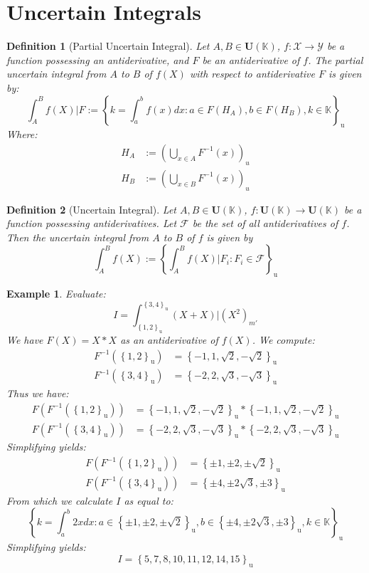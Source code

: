 \documentclass[a4paper,12pt,twoside]{memoir}
\newtheorem{definition}{Definition}[chapter]
\newtheorem{example}{Example}[chapter]
\newcommand{\set}[1]{\left\{#1\right\}} %
\newcommand{\s}[1]{\set{#1}_\mathrm{u}} %
\newcommand{\tsbd}[1]{\mathbf{U}(\mathbb{#1})}
\begin{document}
	\section{Uncertain Integrals}
	
	\begin{definition}[Partial Uncertain Integral]
		Let $A,B \in \tsbd{K}$, $f: \mathcal{X} \to \mathcal{Y}$ be a function possessing an antiderivative, and $F$ be an antiderivative of $f$. The partial uncertain integral from $A$ to $B$ of $f(X)$ with respect to antiderivative $F$ is given by:
		\[
		\int_{A}^{B}{f(X)|F} := \s{k = \int_{a}^{b}f(x)dx : a \in F(H_A), b \in F(H_B), k \in \mathbb{K}}
		\]
		Where:
		\begin{align*}
			H_A & := \left(\bigcup_{x \in A}{F^{-1}(x)}\right)_u  \\
			H_B & := \left(\bigcup_{x \in B}{F^{-1}(x)}\right)_u
		\end{align*}
	\end{definition}
	
	\begin{definition}[Uncertain Integral]
		Let $A,B \in \tsbd{K}$, $f: \tsbd{K} \to \tsbd{K}$ be a function possessing antiderivatives. Let $\mathcal{F}$ be the set of all antiderivatives of $f$. Then the uncertain integral from $A$ to $B$ of $f$ is given by
		\[
		\int_{A}^{B}{f(X)} := \s{\int_{A}^{B}f(X)|F_i : F_i \in \mathcal{F}}
		\]
	\end{definition}
	
	\begin{example}
		Evaluate:
		\[I = \int_{\s{1,2}}^{\s{3,4}}{(X+X)|(X^2)_{m'}}\]
		We have $F(X) = X*X$ as an antiderivative of $f(X)$. We compute:
		\begin{align*}
			F^{-1}(\s{1,2}) & = \s{-1,1,\sqrt{2},-\sqrt{2}} \\
			F^{-1}(\s{3,4}) & = \s{-2,2,\sqrt{3},-\sqrt{3}}
		\end{align*}
		Thus we have:
		\begin{align*}
			F(F^{-1}(\s{1,2})) & = \s{-1,1,\sqrt{2},-\sqrt{2}} * \s{-1,1,\sqrt{2},-\sqrt{2}} \\
			F(F^{-1}(\s{3,4})) & = \s{-2,2,\sqrt{3},-\sqrt{3}} * \s{-2,2,\sqrt{3},-\sqrt{3}}
		\end{align*}
		Simplifying yields:
		\begin{align*}
			F(F^{-1}(\s{1,2})) & = \s{\pm 1, \pm 2, \pm \sqrt{2}}  \\
			F(F^{-1}(\s{3,4})) & = \s{\pm 4, \pm 2\sqrt{3}, \pm 3}
		\end{align*}
		From which we calculate $I$ as equal to:
		\[
		\s{k = \int_{a}^{b}{2xdx}: a \in \s{\pm 1, \pm 2, \pm \sqrt{2}}, b \in \s{\pm 4, \pm 2\sqrt{3}, \pm 3}, k \in \mathbb{K}}
		\]
		Simplifying yields:
		\[I = \s{5, 7, 8, 10, 11, 12, 14, 15}\]
	\end{example}
	
\end{document}

